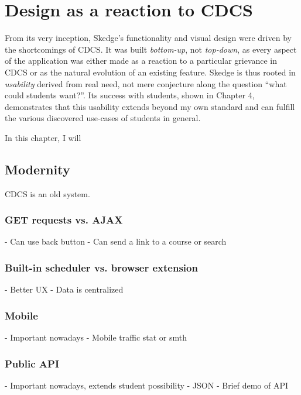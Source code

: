 
\chapter{Design as a reaction to CDCS}

From its very inception, Skedge's functionality and visual design were driven by the shortcomings of CDCS. It was built \emph{bottom-up}, not \emph{top-down}, as every aspect of the application was either made as a reaction to a particular grievance in CDCS or as the natural evolution of an existing feature. Skedge is thus rooted in \emph{usability} derived from real need, not mere conjecture along the question ``what could students want?''. Its success with students, shown in Chapter 4, demonstrates that this usability extends beyond my own standard and can fulfill the various discovered use-cases of students in general.

In this chapter, I will


\section{Modernity}

CDCS is an old system.

\subsection{GET requests vs. AJAX}

- Can use back button
- Can send a link to a course or search

\subsection{Built-in scheduler vs. browser extension}

- Better UX
- Data is centralized

\subsection{Mobile}

- Important nowadays
- Mobile traffic stat or smth

\subsection{Public API}

- Important nowadays, extends student possibility
- JSON
- Brief demo of API

